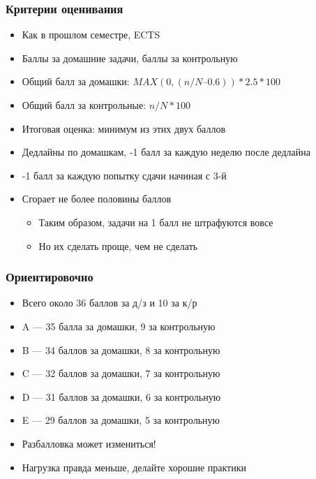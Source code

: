 \documentclass{../../slides-style}
\begin{document}
    \begin{frame}
        \frametitle{Критерии оценивания}
        \begin{itemize}
            \item Как в прошлом семестре, ECTS
            \item Баллы за домашние задачи, баллы за контрольную
            \item Общий балл за домашки: $MAX(0, (n/N – 0.6)) * 2.5 * 100$
            \item Общий балл за контрольные: $n/N * 100$
            \item Итоговая оценка: минимум из этих двух баллов
            \item Дедлайны по домашкам, -1 балл за каждую неделю после дедлайна
            \item -1 балл за каждую попытку сдачи начиная с 3-й
            \item Сгорает не более половины баллов
            \begin{itemize}
                \item Таким образом, задачи на 1 балл не штрафуются вовсе
                \item Но их сделать проще, чем не сделать
            \end{itemize}
        \end{itemize}
    \end{frame}

    \begin{frame}
        \frametitle{Ориентировочно}
        \begin{itemize}
            \item Всего около 36 баллов за д/з и 10 за к/р
            \item A --- 35 балла за домашки, 9 за контрольную
            \item B --- 34 баллов за домашки, 8 за контрольную
            \item C --- 32 баллов за домашки, 7 за контрольную
            \item D --- 31 баллов за домашки, 6 за контрольную
            \item E --- 29 баллов за домашки, 5 за контрольную
        \end{itemize}
        
        \vspace{0.5cm}

        \begin{itemize}
            \item Разбалловка может измениться!
            \item Нагрузка правда меньше, делайте хорошие практики
        \end{itemize}
    \end{frame}
\end{document}
